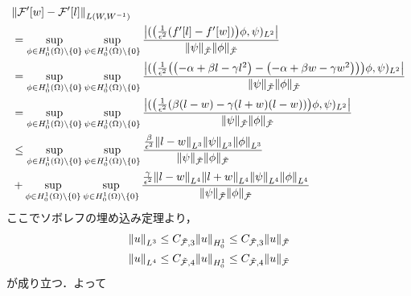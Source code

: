 \begin{align}
  &\norm{\mathcal{F}'\qty[w]-\mathcal{F}'\qty[l]}_{L\qty(W,W^{-1})}\\
  &=
  \sup\limits_{\phi \in H^1_0(\Omega) \backslash \{ 0 \} }
  \sup\limits_{\psi \in H^1_0(\Omega) \backslash \{ 0 \} }
  \frac
  {\qty| (\qty(\frac{1}{\epsilon^2}\qty(f^\prime[l]-f^\prime[w]))\phi,\psi)_{L^2} |}
  {\norm{\psi}_{\tilde{\mathcal{F}}}\norm{\phi}_{\tilde{\mathcal{F}}}}\\
  &=
  \sup\limits_{\phi \in H^1_0(\Omega) \backslash \{ 0 \} }
  \sup\limits_{\psi \in H^1_0(\Omega) \backslash \{ 0 \} }
  \frac
  {\qty|( \qty(\frac{1}{\epsilon^2}
  \qty(\qty(-\alpha  + \beta l - \gamma l^2)-\qty(-\alpha  + \beta w - \gamma w^2)))\phi,\psi )_{L^2}|}
  {\norm{\psi}_{\tilde{\mathcal{F}}}\norm{\phi}_{\tilde{\mathcal{F}}}}\\
  &=
  \sup\limits_{\phi \in H^1_0(\Omega) \backslash \{ 0 \} }
  \sup\limits_{\psi \in H^1_0(\Omega) \backslash \{ 0 \} }
  \frac
  {\qty|( \qty(\frac{1}{\epsilon^2}
  \qty(\beta\qty(l-w)-\gamma\qty(l+w)\qty(l-w)))\phi,\psi )_{L^2}|}
  {\norm{\psi}_{\tilde{\mathcal{F}}}\norm{\phi}_{\tilde{\mathcal{F}}}}\\
  &\leq
  \sup\limits_{\phi \in H^1_0(\Omega) \backslash \{ 0 \} }
  \sup\limits_{\psi \in H^1_0(\Omega) \backslash \{ 0 \} }
  \frac
  {\frac{\beta}{\epsilon^2}\norm{l-w}_{L^3}
  \norm{\psi}_{L^3}\norm{\phi}_{L^3}}
  {\norm{\psi}_{\tilde{\mathcal{F}}}\norm{\phi}_{\tilde{\mathcal{F}}}}\\
  &+
  \sup\limits_{\phi \in H^1_0(\Omega) \backslash \{ 0 \} }
  \sup\limits_{\psi \in H^1_0(\Omega) \backslash \{ 0 \} }
  \frac
  {\frac{\gamma}{\epsilon^2}\norm{l-w}_{L^4}\norm{l+w}_{L^4}
  \norm{\psi}_{L^4}\norm{\phi}_{L^4}}
  {\norm{\psi}_{\tilde{\mathcal{F}}}\norm{\phi}_{\tilde{\mathcal{F}}}}\\
\end{align}
ここでソボレフの埋め込み定理より，
\begin{align}
  \norm{u}_{L^3}\leq C_{{\tilde{\mathcal{F}}},3} \norm{u}_{H^1_0}\leq C_{{\tilde{\mathcal{F}}},3}\norm{u}_{\tilde{\mathcal{F}}}\\
  \norm{u}_{L^4}\leq C_{{\tilde{\mathcal{F}}},4} \norm{u}_{H^1_0}\leq C_{{\tilde{\mathcal{F}}},4}\norm{u}_{\tilde{\mathcal{F}}}\\
\end{align}
が成り立つ．よって
